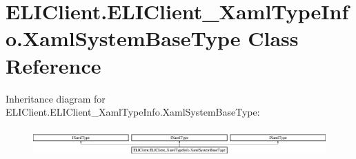 \hypertarget{class_e_l_i_client_1_1_e_l_i_client___xaml_type_info_1_1_xaml_system_base_type}{}\section{E\+L\+I\+Client.\+E\+L\+I\+Client\+\_\+\+Xaml\+Type\+Info.\+Xaml\+System\+Base\+Type Class Reference}
\label{class_e_l_i_client_1_1_e_l_i_client___xaml_type_info_1_1_xaml_system_base_type}
Inheritance diagram for E\+L\+I\+Client.\+E\+L\+I\+Client\+\_\+\+Xaml\+Type\+Info.\+Xaml\+System\+Base\+Type\+:\begin{figure}[H]
\begin{center}
\leavevmode
\includegraphics[height=1.111111cm]{d5/d45/class_e_l_i_client_1_1_e_l_i_client___xaml_type_info_1_1_xaml_system_base_type}
\end{center}
\end{figure}
